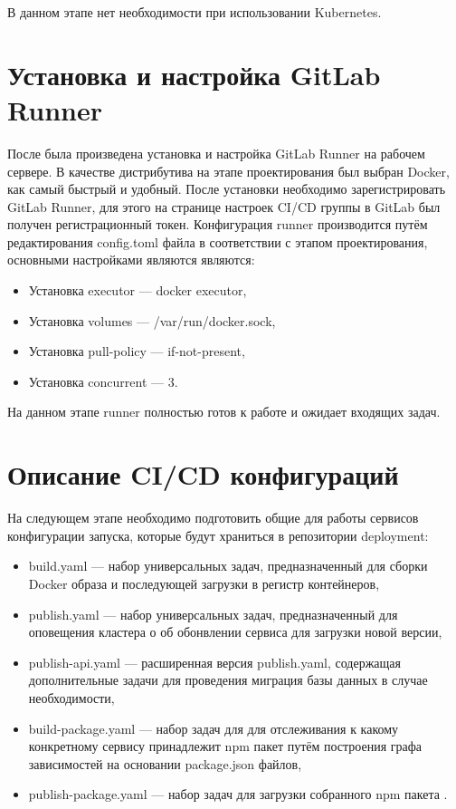 В данном этапе нет необходимости при использовании Kubernetes.

\section{Установка и настройка GitLab Runner}

После была произведена установка и настройка GitLab Runner на рабочем сервере.
В качестве дистрибутива на этапе проектирования был выбран Docker, как самый быстрый и удобный.
После установки необходимо зарегистрировать GitLab Runner, для этого на странице настроек CI/CD группы в GitLab был получен регистрационный токен.
Конфигурация runner производится путём редактирования config.toml\cite{web:gitlab:docs} файла в соответствии с этапом проектирования, основными настройками являются являются:

\begin{itemize}
    \item Установка executor --- docker executor,
    \item Установка volumes --- /var/run/docker.sock\cite{web:docker:docs},
    \item Установка pull-policy --- if-not-present,
    \item Установка concurrent --- 3.
\end{itemize}

На данном этапе runner полностью готов к работе и ожидает входящих задач.

\section{Описание CI/CD конфигураций}

На следующем этапе необходимо подготовить общие для работы сервисов конфигурации запуска, которые будут храниться в репозитории deployment:

\begin{itemize}
    \item build.yaml --- набор универсальных задач, предназначенный для сборки Docker образа и последующей загрузки в  регистр контейнеров,
    \item publish.yaml --- набор универсальных задач, предназначенный для оповещения кластера о об обонвлении сервиса для загрузки новой версии,
    \item publish-api.yaml --- расширенная версия publish.yaml, содержащая дополнительные задачи для проведения миграция базы данных в случае необходимости,
    \item build-package.yaml --- набор задач для для отслеживания к какому конкретному сервису принадлежит npm пакет путём построения графа зависимостей на основании package.json файлов,
    \item publish-package.yaml --- набор задач для загрузки собранного npm пакета .
\end{itemize}

